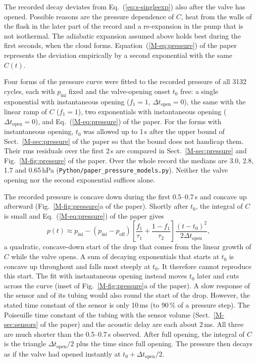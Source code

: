 \documentclass[12pt]{article}
\begin{document}
The recorded decay deviates from Eq.~(\ref{eq:s-singleexp}) also after the valve has opened. Possible
reasons are the pressure dependence of $C$, heat from the walls of the flask in the later
part of the record and a re-expansion in the pump that is not isothermal. The adiabatic expansion
assumed above holds best during the first seconds, when the cloud forms. Equation~(\ref{M-eq:pressure}) of
the paper represents the deviation empirically by a second exponential with the same $C(t)$.

Four forms of the pressure curve were fitted to the recorded pressure of all 3132 cycles, each with
$p_\mathrm{ini}$ fixed and the valve-opening onset $t_0$ free:
a single exponential with instantaneous opening ($f_1 = 1$, $\Delta t_\mathrm{open} = 0$), the same with the
linear ramp of $C$ ($f_1 = 1$), two exponentials with instantaneous opening
($\Delta t_\mathrm{open} = 0$), and Eq.~(\ref{M-eq:pressure}) of the paper.
For the forms with instantaneous opening, $t_0$ was allowed up to 1\,s after the upper bound of
Sect.~\ref{M-sec:pressure} of the paper so that the bound does not handicap them.
Their rms residuals over the first 2\,s are compared in Sect.~\ref{M-sec:pressure} and
Fig.~\ref{M-fig:pressure} of the paper.
Over the whole record the medians are
3.0, 2.8, 1.7 and 0.65\,hPa (\texttt{Python/\allowbreak paper\_pressure\_models.py}). Neither the valve
opening nor the second exponential suffices alone.

The recorded pressure is concave down during the first 0.5--0.7\,s and concave up afterward
(Fig.~\ref{M-fig:pressure}a of the paper). Shortly after $t_0$, the integral of $C$ is small and
Eq.~(\ref{M-eq:pressure}) of the paper gives
\begin{equation}
p(t) \approx p_\mathrm{ini} - (p_\mathrm{ini} - p_\mathrm{off})
\left[\frac{f_1}{\tau_1} + \frac{1 - f_1}{\tau_2}\right]\frac{(t - t_0)^2}{2\Delta t_\mathrm{open}},
\end{equation}
a quadratic, concave-down start of the drop that comes from the linear growth of $C$
while the valve
opens. A sum of decaying exponentials that starts at $t_0$ is concave up throughout and falls most steeply
at $t_0$. It therefore cannot reproduce this start. The fit with instantaneous opening instead
moves $t_0$ later and cuts across the curve (inset of Fig.~\ref{M-fig:pressure}a of the paper). A slow
response of the sensor and of its tubing would also round the start of the drop. However, the stated time
constant of the sensor is only 10\,ms (to 90\,\% of a pressure step). The Poiseuille time constant of the
tubing with the sensor volume (Sect.~\ref{M-sec:sensors} of the paper) and the acoustic delay are each about
2\,ms. All three are much shorter than the 0.5--0.7\,s observed.
After full opening, the integral of $C$ is the triangle $\Delta t_\mathrm{open}/2$ plus the time since full
opening. The pressure then decays as if the valve had opened instantly at
$t_0 + \Delta t_\mathrm{open}/2$.
\end{document}
